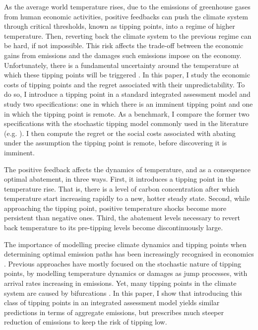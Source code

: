 \documentclass[../../main.tex]{subfiles}
\begin{document}
As the average world temperature rises, due to the emissions of greenhouse gases from human economic activities, positive feedbacks can push the climate system through critical thresholds, known as tipping points, into a regime of higher temperature. Then, reverting back the climate system to the previous regime can be hard, if not impossible. This risk affects the trade-off between the economic gains from emissions and the damages such emissions impose on the economy. Unfortunately, there is a fundamental uncertainty around the temperature at which these tipping points will be triggered \citep{ben-yami_uncertainties_2024}. In this paper, I study the economic costs of tipping points and the regret associated with their unpredictability. To do so, I introduce a tipping point in a standard integrated assessment model and study two specifications: one in which there is an imminent tipping point and one in which the tipping point is remote. As a benchmark, I compare the former two specifications with the stochastic tipping model commonly used in the literature (e.g. \citealt{van_der_ploeg_climate_2018,lemoine_ambiguous_2016,hambel_optimal_2021}). I then compute the regret or the social costs associated with abating under the assumption the tipping point is remote, before discovering it is imminent. 


\iffalse
Literature review.

Talk about \cite{li_economics_2024}.
\fi


\iffalse

The positive feedback affects the dynamics of temperature, and as a consequence optimal abatement, in three ways. First, it introduces a tipping point in the temperature rise. That is, there is a level of carbon concentration after which temperature start increasing rapidly to a new, hotter steady state. Second, while approaching the tipping point, positive temperature shocks become more persistent than negative ones. Third, the abatement levels necessary to revert back temperature to its pre-tipping levels become discontinuously large. 

The importance of modelling precise climate dynamics and tipping points when determining optimal emission paths has been increasingly recognised in economics \citep{van_den_bremer_risk-adjusted_2021,dietz_economic_2021,dietz_are_2020,taconet_social_2021,lontzek_stochastic_2015}. Previous approaches have mostly focused on the stochastic nature of tipping points, by modelling temperature dynamics \citep{dietz_economic_2021} or damages \citep{lontzek_stochastic_2015} as jump processes, with arrival rates increasing in emissions. Yet, many tipping points in the climate system are caused by bifurcations \citep{ashwin_extreme_2020,ashwin_tipping_2012}. In this paper, I show that introducing this class of tipping points in an integrated assessment model yields similar predictions in terms of aggregate emissions, but prescribes much steeper reduction of emissions to keep the risk of tipping low.
\end{document}
